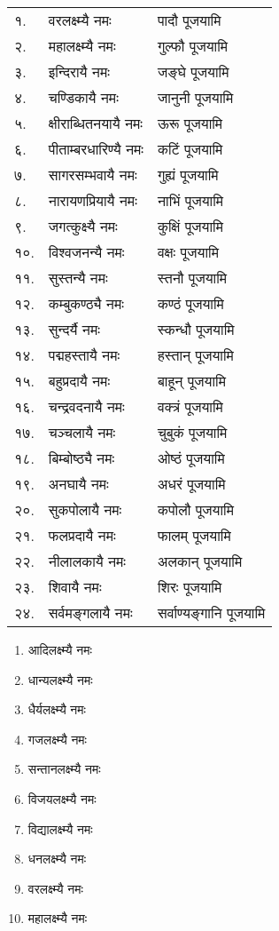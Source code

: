 \begin{longtable}{ll@{— }l}
१. & वरलक्ष्म्यै नमः & पादौ पूजयामि\\
२. & महालक्ष्म्यै नमः & गुल्फौ पूजयामि\\
३. & इन्दिरायै नमः &  जङ्घे पूजयामि\\
४. & चण्डिकायै नमः & जानुनी पूजयामि\\
५. & क्षीराब्धितनयायै नमः & ऊरू  पूजयामि\\
६. & पीताम्बरधारिण्यै नमः & कटिं पूजयामि\\
७. & सागरसम्भवायै नमः & गुह्यं पूजयामि\\
८. & नारायणप्रियायै नमः & नाभिं पूजयामि\\
९. & जगत्कुक्ष्यै नमः & कुक्षिं पूजयामि\\
१०. & विश्वजनन्यै नमः & वक्षः पूजयामि\\
११. & सुस्तन्यै नमः & स्तनौ पूजयामि\\
१२. & कम्बुकण्ठ्यै नमः &  कण्ठं पूजयामि\\
१३. & सुन्दर्यै नमः & स्कन्धौ पूजयामि\\
१४. & पद्महस्तायै नमः & हस्तान् पूजयामि\\
१५. & बहुप्रदायै नमः & बाहून् पूजयामि\\
१६. & चन्द्रवदनायै नमः & वक्त्रं पूजयामि\\
१७. & चञ्चलायै नमः & चुबुकं पूजयामि\\
१८. & बिम्बोष्ठ्यै नमः & ओष्ठं पूजयामि\\
१९. & अनघायै नमः & अधरं पूजयामि\\
२०. & सुकपोलायै नमः & कपोलौ पूजयामि\\
२१. & फलप्रदायै नमः & फालम् पूजयामि\\
२२. & नीलालकायै नमः & अलकान् पूजयामि\\
२३. & शिवायै नमः & शिरः पूजयामि\\
२४. & सर्वमङ्गलायै नमः &  सर्वाण्यङ्गानि पूजयामि\\
\end{longtable}


\begin{multicols}{2}
\begin{enumerate}
\item आदिलक्ष्म्यै नमः
\item धान्यलक्ष्म्यै नमः
\item धैर्यलक्ष्म्यै नमः
\item गजलक्ष्म्यै नमः
\item सन्तानलक्ष्म्यै नमः
\item विजयलक्ष्म्यै नमः
\item विद्यालक्ष्म्यै नमः
\item धनलक्ष्म्यै नमः
\item वरलक्ष्म्यै नमः
\item महालक्ष्म्यै नमः 
\end{enumerate}
\end{multicols}



